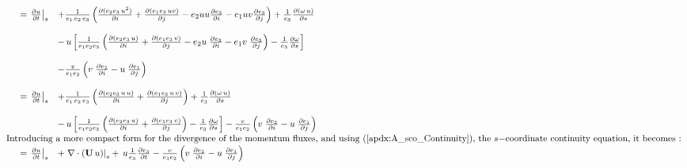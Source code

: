 \documentclass[../main/NEMO_manual]{subfiles}
\begin{document}
\begin{align*}
  {
  \begin{array}{*{20}l}
    &= \left. {\frac{\partial u }{\partial t}} \right|_s
    &+ \frac{1}{e_1\,e_2\,e_3}  \left(  \frac{\partial( e_2 e_3 \,u^2 )}{\partial i}
      + \frac{\partial( e_1 e_3 \,u v )}{\partial j}
      -  e_2 u u \frac{\partial e_3}{\partial i}
      -  e_1 u v \frac{\partial e_3 }{\partial j}    \right)
      + \frac{1}{e_3} \frac{\partial \left( {\omega\,u} \right)}{\partial s} \\ \\
    && - \,u \left[  \frac{1}{e_1 e_2 e_3} \left(   \frac{\partial(e_2 e_3 \, u)}{\partial i}
       + \frac{\partial(e_1 e_3 \, v)}{\partial j}
       -  e_2 u \;\frac{\partial e_3 }{\partial i}
       -  e_1 v \;\frac{\partial e_3 }{\partial j}   \right)
       -\frac{1}{e_3}        \frac{\partial \omega}{\partial s}                       \right] \\ \\
    && - \frac{v}{e_1 e_2 }\left( 	v  \;\frac{\partial e_2 }{\partial i}
       -u  \;\frac{\partial e_1 }{\partial j} 	\right) \\ \\
    &= \left. {\frac{\partial u }{\partial t}} \right|_s
    &+ \frac{1}{e_1\,e_2\,e_3}  \left(  \frac{\partial( e_2 e_3 \,u\,u )}{\partial i}
      + \frac{\partial( e_1 e_3 \,u\,v )}{\partial j}    \right)
      + \frac{1}{e_3 } \frac{\partial \left( {\omega\,u} \right)}{\partial s} \\ \\
    && - \,u \left[  \frac{1}{e_1 e_2 e_3} \left(   \frac{\partial(e_2 e_3 \, u)}{\partial i}
       + \frac{\partial(e_1 e_3 \, v)}{\partial j}  \right)
       -\frac{1}{e_3}        \frac{\partial \omega}{\partial s}                       \right]
       - \frac{v}{e_1 e_2 }\left( 	v   \;\frac{\partial e_2 }{\partial i}
       -u   \;\frac{\partial e_1 }{\partial j} 	\right)                  \\
    \intertext {Introducing a more compact form for the divergence of the momentum fluxes,
    and using (\autoref{apdx:A_sco_Continuity}), the $s-$coordinate continuity equation,
    it becomes : }
    &= \left. {\frac{\partial u }{\partial t}} \right|_s
    &+ \left.  \nabla \cdot \left(   {{\rm {\bf U}}\,u}   \right)    \right|_s
      + \,u \frac{1}{e_3 } \frac{\partial e_3}{\partial t}
      - \frac{v}{e_1 e_2 }\left(    v  \;\frac{\partial e_2 }{\partial i}
      -u  \;\frac{\partial e_1 }{\partial j} 	\right)
    \\
  \end{array}
  }
\end{align*}
\end{document}
